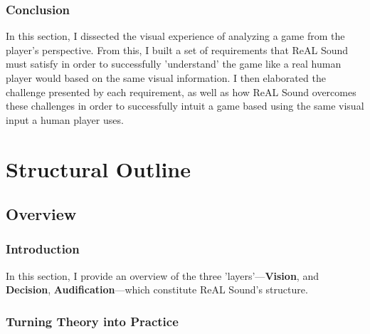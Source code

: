 \documentclass{report}
\newcommand{\rs}{ReAL Sound\xspace}
\newcommand{\state}[1]{\textbf{#1}}
\newcommand{\vision}{\textbf{Vision}\xspace}
\newcommand{\decision}{\textbf{Decision}\xspace}
\newcommand{\audio}{\textbf{Audification}\xspace}
\begin{document}
\subsubsection{Conclusion}
In this section, I dissected the visual experience of analyzing a game from the player's perspective. From this, I built a set of requirements that \rs must satisfy in order to successfully 'understand' the game like a real human player would based on the same visual information. I then elaborated the challenge presented by each requirement, as well as how \rs overcomes these challenges in order to successfully intuit a game based using the same visual input a human player uses. 

\section{Structural Outline}

\subsection{Overview}

\subsubsection{Introduction}
In this section, I provide an overview of the three 'layers'---\vision, and \decision, \audio---which constitute \rs's structure. 

\subsubsection{Turning Theory into Practice}


\begin{figure}
\end{figure}
\end{document}
